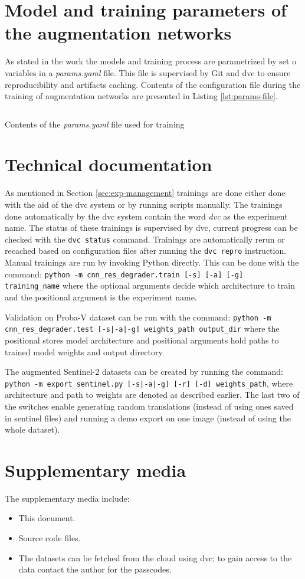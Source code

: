\chapter{Model and training parameters of the augmentation networks}
\label{ch:appendix-params}
As stated in the work the models and training process are parametrized by set o variables in a \textit{params.yaml} file.
This file is supervised by Git and \gls{dvc} to ensure reproducibility and artifacts caching.
Contents of the configuration file during the training of augmentation networks are presented in Listing \ref{lst:params-file}.
\begin{longlisting}
\inputminted{yaml}{listings/params.yaml}
\caption{Contents of the \textit{params.yaml} file used for training}
\label{lst:params-file}
\end{longlisting}

\chapter{Technical documentation}
\label{ch:appendix-technical}
As mentioned in Section \ref{sec:exp-management} trainings are done either done with the aid of the \gls{dvc} system or by running scripts manually.
The trainings done automatically by the \gls{dvc} system contain the word \textit{dvc} as the experiment name.
The status of these trainings is supervised by \gls{dvc}, current progress can be checked with the \texttt{dvc status} command.
Trainings are automatically rerun or recached based on configuration files after running the \texttt{dvc repro} instruction.
Manual trainings are run by invoking Python directly.
This can be done with the command: \texttt{python -m cnn_res_degrader.train [-s] [-a] [-g] training_name} where the optional arguments decide which architecture to train and the positional argument is the experiment name.

Validation on Proba-V dataset can be run with the command: \texttt{python -m cnn_res_degrader.test [-s|-a|-g] weights_path output_dir} where the positional stores model architecture and positional arguments hold paths to trained model weights and output directory.

The augmented Sentinel-2 datasets can be created by running the command: \texttt{python -m export_sentinel.py [-s|-a|-g] [-r] [-d] weights_path}, where architecture and path to weights are denoted as described earlier.
The last two of the switches enable generating random translations (instead of using ones saved in sentinel files) and running a demo export on one image (instead of using the whole dataset).

\chapter{Supplementary media}
The supplementary media include:
\begin{itemize}
	\item This document.
	\item Source code files.
	\item The datasets can be fetched from the cloud using \gls{dvc}; to gain access to the data contact the author for the passcodes.
\end{itemize}

